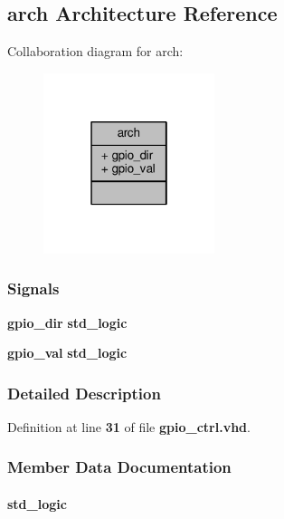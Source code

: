 \subsection{arch Architecture Reference}
\label{classgpio__ctrl_1_1arch}


Collaboration diagram for arch\+:\nopagebreak
\begin{figure}[H]
\begin{center}
\leavevmode
\includegraphics[width=142pt]{d2/d3b/classgpio__ctrl_1_1arch__coll__graph}
\end{center}
\end{figure}
\subsubsection*{Signals}
 \begin{DoxyCompactItemize}
\item 
{\bf gpio\+\_\+dir} {\bfseries \textcolor{comment}{std\+\_\+logic}\textcolor{vhdlchar}{ }} 
\item 
{\bf gpio\+\_\+val} {\bfseries \textcolor{comment}{std\+\_\+logic}\textcolor{vhdlchar}{ }} 
\end{DoxyCompactItemize}


\subsubsection{Detailed Description}


Definition at line {\bf 31} of file {\bf gpio\+\_\+ctrl.\+vhd}.



\subsubsection{Member Data Documentation}
\paragraph[{gpio\+\_\+dir}]{ {\bfseries \textcolor{comment}{std\+\_\+logic}\textcolor{vhdlchar}{ }} \hspace{0.3cm}{\ttfamily [Signal]}}\label{classgpio__ctrl_1_1arch_af7fcb1d50ec139a43b9c53e151b52362}


